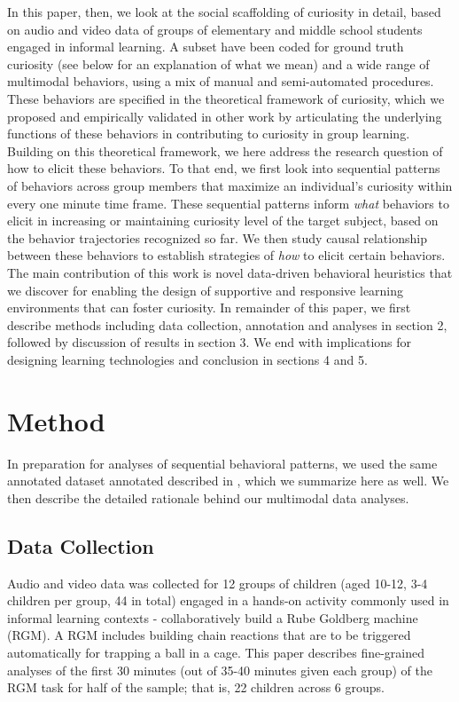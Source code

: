 \documentclass{llncs}
\begin{document}
In this paper, then, we look at the social scaffolding of curiosity in detail, based on audio and video data of groups of elementary and middle school students engaged in informal learning. A subset have been coded for ground truth curiosity (see below for an explanation of what we mean) and a wide range of multimodal behaviors, using a mix of manual and semi-automated procedures. These behaviors are specified in the theoretical framework of curiosity, which we proposed and empirically validated in other work \cite{sinhaectel1} by articulating the underlying functions of these behaviors in contributing to curiosity in group learning. Building on this theoretical framework, we here address the research question of how to elicit these behaviors. To that end, we first look into sequential patterns of behaviors across group members that maximize an individual's curiosity within every one minute time frame. These sequential patterns inform \textit{what} behaviors to elicit in increasing or maintaining curiosity level of the target subject, based on the behavior trajectories recognized so far. We then study causal relationship between these behaviors to establish strategies of \textit{how} to elicit certain behaviors. The main contribution of this work is novel data-driven behavioral heuristics that we discover for enabling the design of supportive and responsive learning environments that can foster curiosity. In remainder of this paper, we first describe methods including data collection, annotation and analyses in section 2, followed by discussion of results in section 3. We end with implications for designing learning technologies and conclusion in sections 4 and 5. 
\vspace{-0.45cm}

\section{Method}
\vspace{-0.45cm}
In preparation for analyses of sequential behavioral patterns, we used the same annotated dataset annotated described in \cite{sinhaectel1}, which we summarize here as well. We then describe the detailed rationale behind our multimodal data analyses.
\vspace{-0.46cm}
\subsection{Data Collection}
\vspace{-0.19cm}
Audio and video data was collected for 12 groups of children (aged 10-12, 3-4 children per group, 44 in total) engaged in a hands-on activity commonly used in informal learning contexts - collaboratively build a Rube Goldberg machine (RGM). A RGM includes building chain reactions that are to be triggered automatically for trapping a ball in a cage. This paper describes fine-grained analyses of the first 30 minutes (out of 35-40 minutes given each group) of the RGM task for half of the sample; that is, 22 children across 6 groups.
\vspace{-0.5cm}
\end{document}
